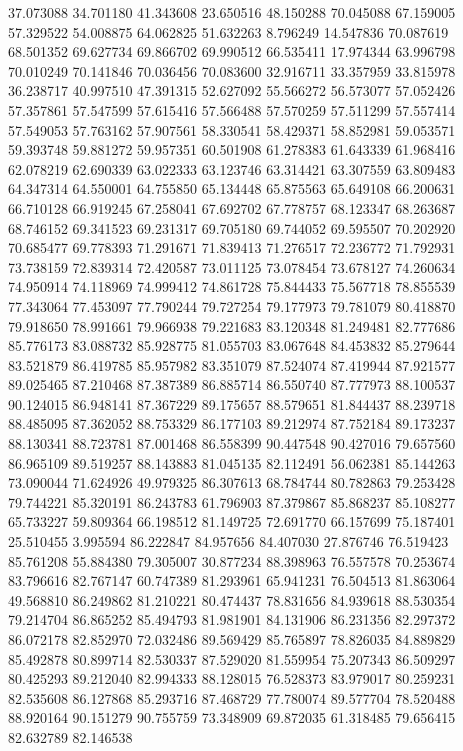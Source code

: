 37.073088
34.701180
41.343608
23.650516
48.150288
70.045088
67.159005
57.329522
54.008875
64.062825
51.632263
8.796249
14.547836
70.087619
68.501352
69.627734
69.866702
69.990512
66.535411
17.974344
63.996798
70.010249
70.141846
70.036456
70.083600
32.916711
33.357959
33.815978
36.238717
40.997510
47.391315
52.627092
55.566272
56.573077
57.052426
57.357861
57.547599
57.615416
57.566488
57.570259
57.511299
57.557414
57.549053
57.763162
57.907561
58.330541
58.429371
58.852981
59.053571
59.393748
59.881272
59.957351
60.501908
61.278383
61.643339
61.968416
62.078219
62.690339
63.022333
63.123746
63.314421
63.307559
63.809483
64.347314
64.550001
64.755850
65.134448
65.875563
65.649108
66.200631
66.710128
66.919245
67.258041
67.692702
67.778757
68.123347
68.263687
68.746152
69.341523
69.231317
69.705180
69.744052
69.595507
70.202920
70.685477
69.778393
71.291671
71.839413
71.276517
72.236772
71.792931
73.738159
72.839314
72.420587
73.011125
73.078454
73.678127
74.260634
74.950914
74.118969
74.999412
74.861728
75.844433
75.567718
78.855539
77.343064
77.453097
77.790244
79.727254
79.177973
79.781079
80.418870
79.918650
78.991661
79.966938
79.221683
83.120348
81.249481
82.777686
85.776173
83.088732
85.928775
81.055703
83.067648
84.453832
85.279644
83.521879
86.419785
85.957982
83.351079
87.524074
87.419944
87.921577
89.025465
87.210468
87.387389
86.885714
86.550740
87.777973
88.100537
90.124015
86.948141
87.367229
89.175657
88.579651
81.844437
88.239718
88.485095
87.362052
88.753329
86.177103
89.212974
87.752184
89.173237
88.130341
88.723781
87.001468
86.558399
90.447548
90.427016
79.657560
86.965109
89.519257
88.143883
81.045135
82.112491
56.062381
85.144263
73.090044
71.624926
49.979325
86.307613
68.784744
80.782863
79.253428
79.744221
85.320191
86.243783
61.796903
87.379867
85.868237
85.108277
65.733227
59.809364
66.198512
81.149725
72.691770
66.157699
75.187401
25.510455
3.995594
86.222847
84.957656
84.407030
27.876746
76.519423
85.761208
55.884380
79.305007
30.877234
88.398963
76.557578
70.253674
83.796616
82.767147
60.747389
81.293961
65.941231
76.504513
81.863064
49.568810
86.249862
81.210221
80.474437
78.831656
84.939618
88.530354
79.214704
86.865252
85.494793
81.981901
84.131906
86.231356
82.297372
86.072178
82.852970
72.032486
89.569429
85.765897
78.826035
84.889829
85.492878
80.899714
82.530337
87.529020
81.559954
75.207343
86.509297
80.425293
89.212040
82.994333
88.128015
76.528373
83.979017
80.259231
82.535608
86.127868
85.293716
87.468729
77.780074
89.577704
78.520488
88.920164
90.151279
90.755759
73.348909
69.872035
61.318485
79.656415
82.632789
82.146538
